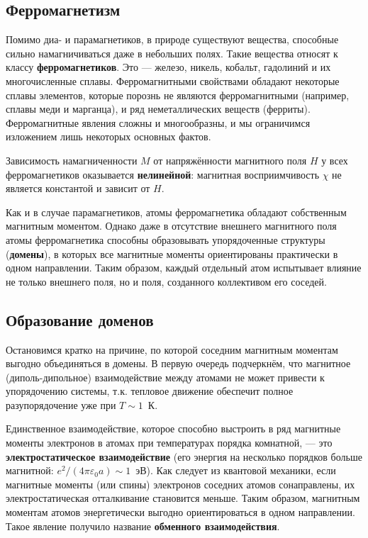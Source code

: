 \documentclass[a4paper]{article}
\begin{document}
\subsection*{Ферромагнетизм}

Помимо диа- и парамагнетиков, в природе существуют вещества, способные сильно намагничиваться даже в небольших полях. Такие вещества относят к классу \textbf{ферромагнетиков}. Это — железо, никель, кобальт, гадолиний и их многочисленные сплавы. Ферромагнитными свойствами обладают некоторые сплавы элементов, которые порознь не являются ферромагнитными (например, сплавы меди и марганца), и ряд неметаллических веществ (ферриты). Ферромагнитные явления сложны и многообразны, и мы ограничимся изложением лишь некоторых основных фактов.

Зависимость намагниченности $M$ от напряжённости магнитного поля $H$ у всех ферромагнетиков оказывается \textbf{нелинейной}: магнитная восприимчивость $\chi$ не является константой и зависит от $H$.

Как и в случае парамагнетиков, атомы ферромагнетика обладают собственным магнитным моментом. Однако даже в отсутствие внешнего магнитного поля атомы ферромагнетика способны образовывать упорядоченные структуры (\textbf{домены}), в которых все магнитные моменты ориентированы практически в одном направлении. Таким образом, каждый отдельный атом испытывает влияние не только внешнего поля, но и поля, созданного коллективом его соседей.

\subsection*{Образование доменов}
Остановимся кратко на причине, по которой соседним магнитным моментам выгодно объединяться в домены. В первую очередь подчеркнём, что магнитное (диполь-дипольное) взаимодействие между атомами не может привести к упорядочению системы, т.к. тепловое движение обеспечит полное разупорядочение уже при $T \sim 1$~К.

Единственное взаимодействие, которое способно выстроить в ряд магнитные моменты электронов в атомах при температурах порядка комнатной, — это \textbf{электростатическое взаимодействие} (его энергия на несколько порядков больше магнитной: $e^2/(4\pi\varepsilon_0 a) \sim 1$~эВ). Как следует из квантовой механики, если магнитные моменты (или спины) электронов соседних атомов сонаправлены, их электростатическая отталкивание становится меньше. Таким образом, магнитным моментам атомов энергетически выгодно ориентироваться в одном направлении. Такое явление получило название \textbf{обменного взаимодействия}.
\end{document}
